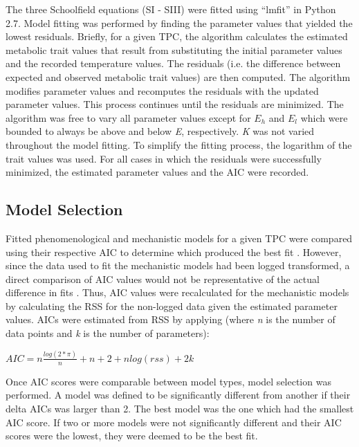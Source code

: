 \documentclass[11pt]{article}  %
\begin{document}
The three Schoolfield equations (SI - SIII) were fitted using ``lmfit'' in Python 2.7. Model fitting was performed by finding the parameter values that yielded the lowest residuals. Briefly, for a given TPC, the algorithm calculates the estimated metabolic trait values that result from substituting the initial parameter values and the recorded temperature values. The residuals (i.e. the difference between expected and observed metabolic trait values) are then computed. The algorithm modifies parameter values and recomputes the residuals with the updated parameter values. This process continues until the residuals are minimized. The algorithm was free to vary all parameter values except for \textit{\(E_h\)} and \textit{\(E_l\)} which were bounded to always be above and below \textit{E}, respectively. \textit{K} was not varied throughout the model fitting. To simplify the fitting process, the logarithm of the trait values was used. For all cases in which the residuals were successfully minimized, the estimated parameter values and the AIC were recorded.

\subsection*{Model Selection}

Fitted phenomenological and mechanistic models for a given TPC were compared using their respective AIC to determine which produced the best fit \cite{Johnson}. However, since the data used to fit the mechanistic models had been logged transformed, a direct comparison of AIC values would not be representative of the actual difference in fits \cite{Akaike}.  Thus, AIC values were recalculated for the mechanistic models by calculating the RSS for the non-logged data given the estimated parameter values. AICs were estimated from RSS by applying (where \textit{n} is the number of data points and \textit{k} is the number of parameters):

\begin{center}
\(AIC =  n \frac{log(2*\pi)}{n} +n+2+n log(rss)+2k\)
\end{center}
 
Once AIC scores were comparable between model types, model selection was performed. A model was defined to be significantly different from another if their delta AICs was larger than 2. The best model was the one which had the smallest AIC score. If two or more models were not significantly different and their AIC scores were the lowest, they were deemed to be the best fit. 
\end{document}
